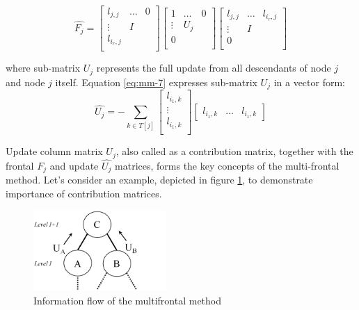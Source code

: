 \begin{equation} \label{eq:mm-6}
\hat{F_{j}} = \begin{bmatrix}
l_{j,j} & \dots & 0 \\
\vdots & I \\
l_{i_{r},j} \\
\end{bmatrix} 
\begin{bmatrix}
1 & \dots & 0 \\
\vdots & U_{j} \\
0 \\
\end{bmatrix} 
\begin{bmatrix}
l_{j,j} & \dots & l_{i_{r},j} \\
\vdots & I \\
0 \\
\end{bmatrix} 
\end{equation}

where sub-matrix $U_{j}$ represents the full update from all descendants of node $j$ and node $j$ itself. Equation \ref{eq:mm-7} expresses sub-matrix $U_{j}$ in a vector form: \\

\begin{equation} \label{eq:mm-7}
\hat{U_{j}} = - \sum_{k \in T[j]}  \begin{bmatrix}
l_{i_1,k} \\
\vdots \\
l_{i_1,k} \\
\end{bmatrix} \begin{bmatrix}
l_{i_1,k} & \dots & l_{i_1,k}
\end{bmatrix}
\end{equation}


Update column matrix $U_{j}$, also called as a contribution matrix, together with the frontal $F_{j}$ and update $\hat{U_j}$ matrices, forms the key concepts of the multi-frontal method. Let's consider an example, depicted in figure \ref{fig:information-float}, to demonstrate importance of contribution matrices.\\



\figpointer{\ref{fig:information-float}}
\begin{figure}[htpb]
  \centering
  \includegraphics[width=0.45\textwidth]{figures/chapter-2/information-flow.png}
\caption{Information flow of the multifrontal method}
\label{fig:information-float}
\end{figure}


